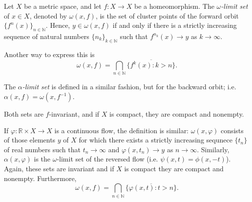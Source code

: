 \documentclass[12pt]{article}
\newcommand{\R}{\mathbb{R}}
\newcommand{\N}{\mathbb{N}}
\begin{document}
Let $X$ be a metric space, and let $f:X\rightarrow X$ be a homeomorphism. 
The \emph{$\omega$-limit set} of $x\in X$, denoted by $\omega(x,f)$, is the set of cluster points of the forward orbit $\{f^n(x)\}_{n\in \N}$. 
Hence, $y\in \omega(x,f)$ if and only if there is a strictly increasing sequence of natural numbers $\{n_k\}_{k\in \N}$ such that $f^{n_k}(x)\rightarrow y$ as $k\rightarrow\infty$.

Another way to express this is
$$\omega(x,f) = \bigcap_{n\in \N} \overline{\{f^k(x): k>n\}}.$$

The \emph{$\alpha$-limit set} is defined in a similar fashion, but for the backward orbit; i.e. $\alpha(x,f)=\omega(x,f^{-1})$.

Both sets are $f$-invariant, and if $X$ is compact, they are compact and nonempty.

If $\varphi:\R\times X\to X$ is a continuous flow, the definition is similar:
$\omega(x,\varphi)$ consists of those elements $y$ of $X$ for which there exists a strictly increasing sequnece $\{t_n\}$ of real numbers such that $t_n\rightarrow \infty$ and $\varphi(x,t_n) \rightarrow y$ as $n\rightarrow\infty$.
Similarly, $\alpha(x,\varphi)$ is the $\omega$-limit set of the reversed flow (i.e. $\psi(x,t) = \phi(x,-t)$).
Again, these sets are invariant and if $X$ is compact they are compact and nonempty. Furthermore,
$$\omega(x,f) = \bigcap_{n\in \N}\overline{\{\varphi(x,t):t>n\}}.$$
\end{document}

